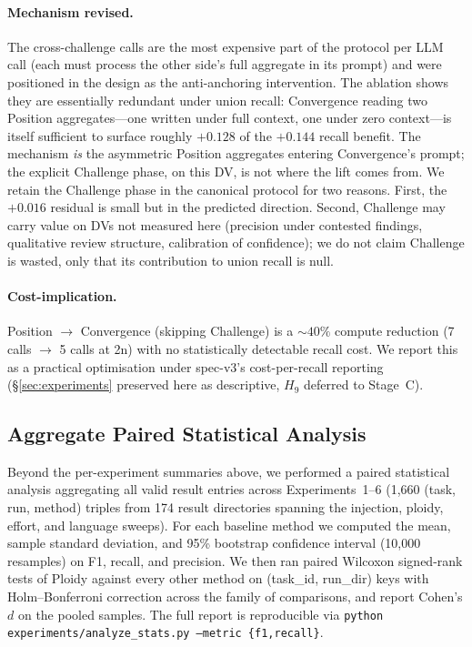 \documentclass[11pt]{article}
\begin{document}
\paragraph{Mechanism revised.}
\label{sec:mechanism-revised}
The cross-challenge calls are the most expensive part of the
protocol per LLM call (each must process the other side's full
aggregate in its prompt) and were positioned in the design as
the anti-anchoring intervention. The ablation shows they are
essentially redundant under union recall: Convergence reading
two Position aggregates---one written under full context, one
under zero context---is itself sufficient to surface roughly
$+0.128$ of the $+0.144$ recall benefit. The mechanism
\emph{is} the asymmetric Position aggregates entering
Convergence's prompt; the explicit Challenge phase, on this DV,
is not where the lift comes from. We retain the Challenge phase
in the canonical protocol for two reasons. First, the
$+0.016$ residual is small but in the predicted direction.
Second, Challenge may carry value on DVs not measured here
(precision under contested findings, qualitative review
structure, calibration of confidence); we do not claim Challenge
is wasted, only that its contribution to union recall is null.

\paragraph{Cost-implication.}
Position $\to$ Convergence (skipping Challenge) is a
$\sim 40\%$ compute reduction (7 calls $\to$ 5 calls at 2n) with
no statistically detectable recall cost. We report this as a
practical optimisation under spec-v3's cost-per-recall reporting
(§\ref{sec:experiments} preserved here as descriptive, $H_9$
deferred to Stage~C).

\subsection{Aggregate Paired Statistical Analysis}
\label{sec:aggregate-stats}

Beyond the per-experiment summaries above, we performed a paired statistical analysis aggregating all valid result entries across Experiments~1--6 (1{,}660 (task, run, method) triples from 174 result directories spanning the injection, ploidy, effort, and language sweeps). For each baseline method we computed the mean, sample standard deviation, and 95\% bootstrap confidence interval (10{,}000 resamples) on F1, recall, and precision. We then ran paired Wilcoxon signed-rank tests of Ploidy against every other method on (task\_id, run\_dir) keys with Holm--Bonferroni correction across the family of comparisons, and report Cohen's $d$ on the pooled samples. The full report is reproducible via \texttt{python experiments/analyze\_stats.py --metric \{f1,recall\}}.
\end{document}
